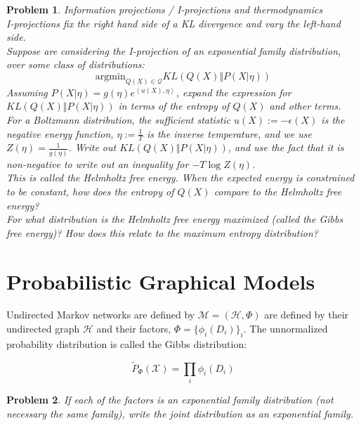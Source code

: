 \documentclass[a4paper]{article}
\newtheorem{problem}{Problem}[section]
\begin{document}
\begin{problem}
  Information projections / I-projections and thermodynamics\\
  I-projections fix the right hand side of a KL divergence and vary the left-hand side. \\
  Suppose are considering the I-projection of an exponential family distribution, over some class of distributions:
  \begin{equation}
    \text{argmin}_{Q(X) \in \mathcal{Q}} KL \left( Q(X) \Vert P( X \vert \eta) \right)
    \label{I-projection}
  \end{equation}
  Assuming $P(X \vert \eta) = g(\eta) e^{\left< u(X), \eta \right> }$, expand the expression for $KL\left( Q(X) \Vert P( X \vert \eta) \right)$ in terms of the entropy of $Q(X)$ and other terms. \\
  For a Boltzmann distribution, the sufficient statistic $u(X) := -\epsilon(X)$ is the negative energy function, $\eta := \frac{1}{T}$ is the inverse temperature, and we use $Z(\eta) = \frac{1}{g(\eta)}$.  Write out $KL \left( Q(X) \Vert P(X \vert \eta) \right)$, and use the fact that it is non-negative to write out an inequality for $- T \log Z(\eta)$. \\
  This is called the Helmholtz free energy.  When the expected energy is constrained to be constant, how does the entropy of $Q(X)$ compare to the Helmholtz free energy? \\
  For what distribution is the Helmholtz free energy maximized (called the Gibbs free energy)?  How does this relate to the maximum entropy distribution?
\end{problem}

\section{Probabilistic Graphical Models}

Undirected Markov networks are defined by $\mathcal{M} = \left( \mathcal{H}, \Phi \right) $ are defined by their undirected graph $\mathcal{H}$ and their factors, $\Phi = \{ \phi_i(D_i) \}_i$.  
The unnormalized probability distribution is called the Gibbs distribution:

\begin{equation}
  \tilde{P}_\Phi(\mathcal{X}) = \prod_i \phi_i(D_i)
  \label{Gibbs distribution}
\end{equation}

\begin{problem}
  If each of the factors is an exponential family distribution (not necessary the same family), write the joint distribution as an exponential family.  \\
\end{problem}
\end{document}
